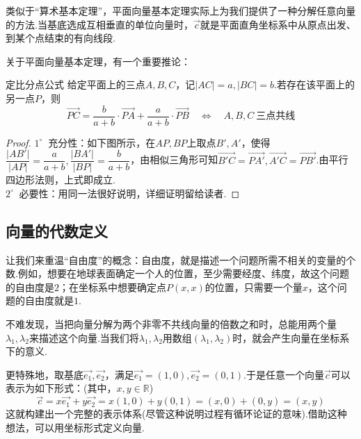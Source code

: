 \documentclass[lang=cn, zihao=5]{elegantbook}
\newcommand{\xl}[1]{\overrightarrow{#1}}
\newcommand{\R}{\mathbb{R}}
\newcommand{\buzhou}[1]{$#1^{\circ} \ $}
\begin{document}
类似于“算术基本定理”，平面向量基本定理实际上为我们提供了一种分解任意向量的方法.当基底选成互相垂直的单位向量时，$\vec{c}$就是平面直角坐标系中从原点出发、到某个点结束的有向线段.

关于平面向量基本定理，有一个重要推论：

\begin{corollary}{定比分点公式}
	给定平面上的三点$A,B,C$，记$|AC|=a,|BC|=b$.若存在该平面上的另一点$P$，则$$\xl{PC} = \frac{b}{a+b} \cdot \xl{PA} + \frac{a}{a+b} \cdot \xl{PB} \quad \Longleftrightarrow \quad A,B,C~\textit{三点共线}$$
\end{corollary}
\begin{proof}
	\buzhou{1} 充分性：如下图所示，在$AP,BP$上取点$B',A'$，使得$\dfrac{|AB'|}{|AP|}=\dfrac{a}{a+b},\dfrac{|BA'|}{|BP|}=\dfrac{b}{a+b}$，由相似三角形可知$\xl{B'C}=\xl{PA'},\xl{A'C}=\xl{PB'}$.由平行四边形法则，上式即成立. \\
	\buzhou{2} 必要性：用同一法很好说明，详细证明留给读者.
\end{proof}


\subsection{向量的代数定义}

让我们来重温“自由度”的概念：自由度，就是描述一个问题所需不相关的变量的个数.例如，想要在地球表面确定一个人的位置，至少需要经度、纬度，故这个问题的自由度是$2$；在坐标系中想要确定点$P(x,x)$的位置，只需要一个量$x$，这个问题的自由度就是$1$.

不难发现，当把向量分解为两个非零不共线向量的倍数之和时，总能用两个量$\lambda _1,\lambda _2$来描述这个向量.当我们将$\lambda _1,\lambda _2$用数组$(\lambda _1,\lambda _2)$时，就会产生向量在坐标系下的意义.

更特殊地，取基底$\vec{e_1},\vec{e_2}$，满足$\vec{e_1}=(1,0),\vec{e_2}=(0,1)$.于是任意一个向量$\vec{c}$可以表示为如下形式：(其中，$x,y \in \R$)$$\vec{c}=x\vec{e_1}+y\vec{e_2}=x(1,0)+y(0,1)=(x,0)+(0,y)=(x,y)$$
这就构建出一个完整的表示体系(尽管这种说明过程有循环论证的意味).借助这种想法，可以用坐标形式定义向量.
\end{document}
